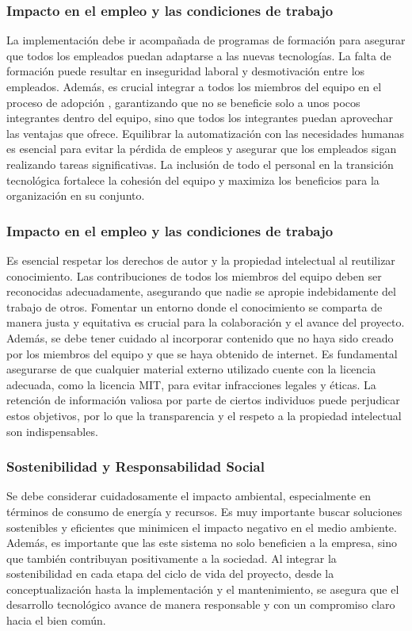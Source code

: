 \subsubsection{Impacto en el empleo y las condiciones de trabajo}
La implementación debe ir acompañada de programas de formación para asegurar 
que todos los empleados puedan adaptarse a las nuevas tecnologías. La falta de formación 
puede resultar en inseguridad laboral y desmotivación entre los empleados. Además, es 
crucial integrar a todos los miembros del equipo en el proceso de adopción , 
garantizando que no se beneficie solo a unos pocos integrantes dentro del equipo, sino que 
todos los integrantes puedan aprovechar las ventajas que ofrece. Equilibrar 
la automatización con las necesidades humanas es esencial para evitar la pérdida de 
empleos y asegurar que los empleados sigan realizando tareas significativas. La inclusión 
de todo el personal en la transición tecnológica fortalece la cohesión del equipo y 
maximiza los beneficios para la organización en su conjunto.

\subsubsection{Impacto en el empleo y las condiciones de trabajo}
Es esencial respetar los derechos de autor y la propiedad intelectual 
al reutilizar conocimiento. Las contribuciones de todos los miembros 
del equipo deben ser reconocidas adecuadamente, asegurando que nadie se 
apropie indebidamente del trabajo de otros. Fomentar un entorno donde el 
conocimiento se comparta de manera justa y equitativa es crucial para la colaboración 
y el avance del proyecto. Además, se debe tener cuidado al incorporar contenido que 
no haya sido creado por los miembros del equipo y que se haya obtenido de internet. 
Es fundamental asegurarse de que cualquier material externo utilizado cuente con la 
licencia adecuada, como la licencia MIT, para evitar infracciones legales y éticas. La 
retención de información valiosa por parte de ciertos individuos puede perjudicar 
estos objetivos, por lo que la transparencia y el respeto a la propiedad intelectual son indispensables.

\subsubsection{Sostenibilidad y Responsabilidad Social} 
Se debe considerar cuidadosamente el impacto ambiental, especialmente en términos de 
consumo de energía y recursos. Es muy importante buscar soluciones sostenibles y 
eficientes que minimicen el impacto negativo en el medio ambiente. Además, es importante que 
las este sistema no solo beneficien a la empresa, sino que también contribuyan positivamente 
a la sociedad. Al integrar la sostenibilidad en cada etapa del ciclo de vida del proyecto, 
desde la conceptualización hasta la implementación y el mantenimiento, se asegura que el 
desarrollo tecnológico avance de manera responsable y con un compromiso claro hacia el bien común.


